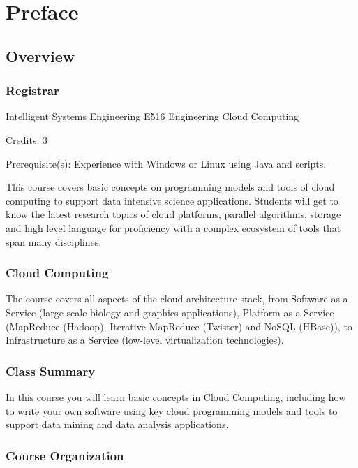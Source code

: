 \part{Preface}

\chapter{Overview}

\FILENAME

\section{Registrar}

Intelligent Systems Engineering
E516 Engineering Cloud Computing

Credits: 3

Prerequisite(s): Experience with Windows or Linux using Java and scripts.

This course covers basic concepts on programming models and tools of
cloud computing to support data intensive science
applications. Students will get to know the latest research topics of
cloud platforms, parallel algorithms, storage and high level language
for proficiency with a complex ecosystem of tools that span many
disciplines.  


\section{Cloud Computing}

The course covers all aspects of the cloud architecture stack, from
Software as a Service (large-scale biology and graphics applications),
Platform as a Service (MapReduce (Hadoop), Iterative MapReduce
(Twister) and NoSQL (HBase)), to Infrastructure as a Service
(low-level virtualization technologies).



\section{Class Summary}

In this course you will learn basic concepts in Cloud Computing,
including how to write your own software using key cloud programming
models and tools to support data mining and data analysis
applications.

\section{Course Organization}

